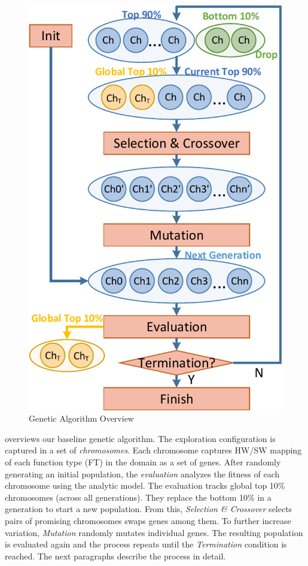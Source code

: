 \subsection{\garand}


	

\begin{figure}[h]
	\centering
	\includegraphics[width=0.5\linewidth]{fig/pGA.pdf}
	\caption{Genetic Algorithm Overview}
	\label{fig:GA}
\end{figure}

 overviews our baseline genetic algorithm. The exploration configuration is captured in a set of \emph{chromosomes}. Each chromosome captures HW/SW mapping of each function type (FT) in the domain as a set of genes. After randomly generating an initial population, the \emph{evaluation} analyzes the fitness of each chromosome using the analytic model. The evaluation tracks global top 10\% chromosomes (across all generations). They replace the bottom 10\% in a generation to start a new population. From this, \emph{Selection \& Crossover} selects pairs of promising chromosomes swaps genes among them. To further increase variation, \emph{Mutation} randomly mutates individual genes. The resulting population is evaluated again and the process repeats until the \emph{Termination} condition is reached. The next paragraphs describe the process in detail. 



